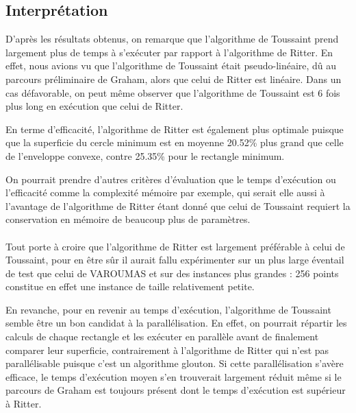 \subsection{Interprétation}
D'après les résultats obtenus, on remarque que l'algorithme de Toussaint prend largement plus de temps à s'exécuter par rapport à l'algorithme de Ritter. En effet, nous avions vu que l'algorithme de Toussaint était pseudo-linéaire, dû au parcours préliminaire de Graham, alors que celui de Ritter est linéaire. Dans un cas défavorable, on peut même observer que l'algorithme de Toussaint est 6 fois plus long en exécution que celui de Ritter.

En terme d'efficacité, l'algorithme de Ritter est également plus optimale puisque que la superficie du cercle minimum est en moyenne 20.52\% plus grand que celle de l'enveloppe convexe, contre 25.35\% pour le rectangle minimum.

On pourrait prendre d'autres critères d'évaluation que le temps d'exécution ou l'efficacité comme la complexité mémoire par exemple, qui serait elle aussi à l'avantage de l'algorithme de Ritter étant donné que celui de Toussaint requiert la conservation en mémoire de beaucoup plus de paramètres.

\paragraph{}
Tout porte à croire que l'algorithme de Ritter est largement préférable à celui de Toussaint, pour en être sûr il aurait fallu expérimenter sur un plus large éventail de test que celui de VAROUMAS et sur des instances plus grandes : 256 points constitue en effet une instance de taille relativement petite.

En revanche, pour en revenir au temps d'exécution, l'algorithme de Toussaint semble être un bon candidat à la parallélisation. En effet, on pourrait répartir les calculs de chaque rectangle et les exécuter en parallèle avant de finalement comparer leur superficie, contrairement à l'algorithme de Ritter qui n'est pas parallélisable puisque c'est un algorithme glouton. Si cette parallélisation s'avère efficace, le temps d'exécution moyen s'en trouverait largement réduit même si le parcours de Graham est toujours présent dont le temps d'exécution est supérieur à Ritter.
